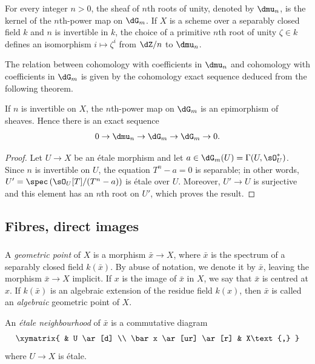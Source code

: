For every integer $n>0$, the sheaf of $n$th roots of unity, denoted by
$\dmu_n$, is the kernel of the $n$th-power map on $\dG_m$.
If $X$ is a scheme over a separably closed field $k$ and $n$ is
invertible in $k$, the choice of a primitive $n$th root of unity
$\zeta\in k$ defines an isomorphism $i\mapsto\zeta^i$ from $\dZ/n$ to
$\dmu_n$.

The relation between cohomology with coefficients in $\dmu_n$ and
cohomology with coefficients in $\dG_m$ is given by the cohomology exact
sequence deduced from the following theorem.

\begin{theorem}\label{I:2-2-5}
If $n$ is invertible on $X$, the $n$th-power map on $\dG_m$ is an
epimorphism of sheaves. Hence there is an exact sequence
\[
  0 \to \dmu_n \to \dG_m \to \dG_m \to 0\text{.}
\]
\end{theorem}
\begin{proof}
Let $U\to X$ be an étale morphism and let
$a\in\dG_m(U)=\Gamma(U,\sO_U^*)$. Since $n$ is invertible on $U$,
the equation $T^n-a=0$ is separable; in other words,
$U'=\spec\left(\sO_U[T]/(T^n-a)\right)$ is étale over $U$. Moreover,
$U'\to U$ is surjective and this element has an $n$th root on $U'$, which proves
the result.
\end{proof}

\subsection{Fibres, direct images}\label{I:2-3}

\subsubsection{}\label{I:2-3-1}

A \emph{geometric point} of $X$ is a morphism $\bar x\to X$, where
$\bar x$ is the spectrum of a separably closed field $k(\bar x)$. By
abuse of notation, we denote it by $\bar x$, leaving the morphism
$\bar x\to X$ implicit. If $x$ is the image of $\bar x$ in $X$, we say
that $\bar x$ is centred at $x$. If $k(\bar x)$ is an algebraic extension
of the residue field $k(x)$, then $\bar x$ is called an
\emph{algebraic} geometric point of $X$.

An \emph{étale neighbourhood} of $\bar x$ is a commutative diagram
\[\xymatrix{
  & U \ar[d] \\
  \bar x \ar[ur] \ar[r]
  & X\text{,}
}\]
where $U\to X$ is étale.

